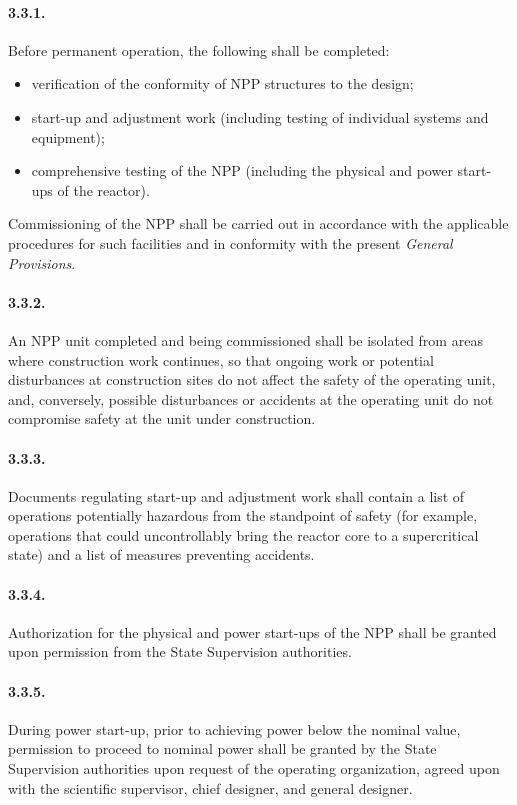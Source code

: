 \documentclass[openright]{bookest}
\begin{document}
\paragraph{3.3.1.}
Before permanent operation, the following shall be completed:
\begin{itemize}
    \item verification of the conformity of NPP structures to the design;
    \item start-up and adjustment work (including testing of individual systems and equipment);
    \item comprehensive testing of the NPP (including the physical and power start-ups of the reactor).
\end{itemize}
Commissioning of the NPP shall be carried out in accordance with the applicable procedures for such facilities and in conformity with the present \textit{General Provisions}.

\paragraph{3.3.2.}
An NPP unit completed and being commissioned shall be isolated from areas where construction work continues, so that ongoing work or potential disturbances at construction sites do not affect the safety of the operating unit, and, conversely, possible disturbances or accidents at the operating unit do not compromise safety at the unit under construction.

\paragraph{3.3.3.}
Documents regulating start-up and adjustment work shall contain a list of operations potentially hazardous from the standpoint of safety (for example, operations that could uncontrollably bring the reactor core to a supercritical state) and a list of measures preventing accidents.

\paragraph{3.3.4.}
Authorization for the physical and power start-ups of the NPP shall be granted upon permission from the State Supervision authorities.

\paragraph{3.3.5.}
During power start-up, prior to achieving power below the nominal value, permission to proceed to nominal power shall be granted by the State Supervision authorities upon request of the operating organization, agreed upon with the scientific supervisor, chief designer, and general designer.
\end{document}

